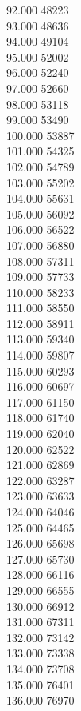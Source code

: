 { 92.000	48223 \\
 93.000	48636 \\
 94.000	49104 \\
 95.000	52002 \\
 96.000	52240 \\
 97.000	52660 \\
 98.000	53118 \\
 99.000	53490 \\
 100.000	53887 \\
 101.000	54325 \\
 102.000	54789 \\
 103.000	55202 \\
 104.000	55631 \\
 105.000	56092 \\
 106.000	56522 \\
 107.000	56880 \\
 108.000	57311 \\
 109.000	57733 \\
 110.000	58233 \\
 111.000	58550 \\
 112.000	58911 \\
 113.000	59340 \\
 114.000	59807 \\
 115.000	60293 \\
 116.000	60697 \\
 117.000	61150 \\
 118.000	61740 \\
 119.000	62040 \\
 120.000	62522 \\
 121.000	62869 \\
 122.000	63287 \\
 123.000	63633 \\
 124.000	64046 \\
 125.000	64465 \\
 126.000	65698 \\
 127.000	65730 \\
 128.000	66116 \\
 129.000	66555 \\
 130.000	66912 \\
 131.000	67311 \\
 132.000	73142 \\
 133.000	73338 \\
 134.000	73708 \\
 135.000	76401 \\
 136.000	76970 \\
}
